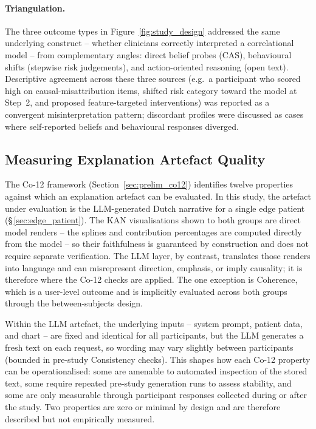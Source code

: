\documentclass[12pt, a4paper]{article}
\begin{document}
\paragraph*{Triangulation.}
The three outcome types in Figure~\ref{fig:study_design} addressed the
same underlying construct -- whether clinicians correctly interpreted a
correlational model -- from complementary angles: direct belief probes
(CAS), behavioural shifts (stepwise risk judgements), and
action-oriented reasoning (open text).
Descriptive agreement across these three sources (e.g.\ a participant
who scored high on causal-misattribution items, shifted risk category
toward the model at Step~2, and proposed feature-targeted
interventions) was reported as a convergent misinterpretation pattern;
discordant profiles were discussed as cases where self-reported beliefs
and behavioural responses diverged.

\subsection{Measuring Explanation Artefact Quality}
\label{sec:method_co12}

The Co-12 framework (Section~\ref{sec:prelim_co12}) identifies twelve properties
against which an explanation artefact can be evaluated. In this study,
the artefact under evaluation is the LLM-generated Dutch narrative for a
single edge patient (\S\,\ref{sec:edge_patient}). The KAN visualisations
shown to both groups are direct model renders -- the splines and
contribution percentages are computed directly from the model -- so their
faithfulness is guaranteed by construction and does not require separate
verification. The LLM layer, by contrast, translates those renders into
language and can misrepresent direction, emphasis, or imply causality;
it is therefore where the Co-12 checks are applied. The one exception is
Coherence, which is a user-level outcome and is implicitly evaluated across
both groups through the between-subjects design.

Within the LLM artefact, the underlying inputs -- system prompt, patient
data, and chart -- are fixed and identical for all participants, but the
LLM generates a fresh text on each request, so wording may vary slightly
between participants (bounded in pre-study Consistency checks). This shapes
how each Co-12 property can be operationalised: some are amenable to automated
inspection of the stored text, some require repeated pre-study generation runs to assess
stability, and some are only measurable through participant responses
collected during or after the study. Two properties are zero or minimal
by design and are therefore described but not empirically measured.
\end{document}

